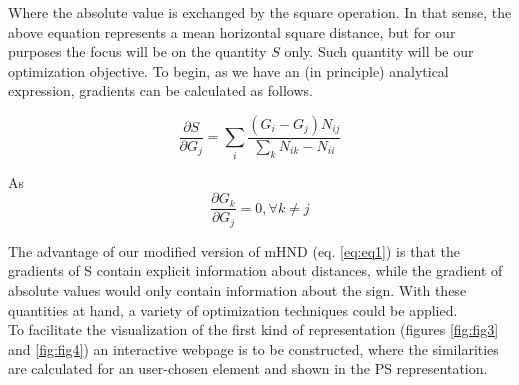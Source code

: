 \documentclass[article]{article}
\begin{document}
Where the absolute value is exchanged by the square operation. In that sense, the above equation represents a mean horizontal square distance, but for our purposes the focus will be on the quantity $S$ only. Such quantity will be our optimization objective. To begin, as we have an (in principle) analytical expression, gradients can be calculated as follows.

\begin{equation}
\frac{\partial S}{\partial G_j} = \sum_i \frac{ ( G_i - G_j ) N_{ij} }{\sum_k N_{ik} - N_{ii}}
\end{equation}

As \\
$$
\frac{\partial G_{k}}{\partial G_j} = 0, \forall k \neq j
$$

The advantage of our modified version of mHND (eq. \ref{eq:eq1}) is that the gradients of S contain explicit information about distances, while the gradient of absolute values would only contain information about the sign. With these quantities at hand, a variety of optimization techniques could be applied. \\





To facilitate the visualization of the first kind of representation (figures \ref{fig:fig3} and \ref{fig:fig4}) an interactive webpage is to be constructed, where the similarities are calculated for an user-chosen element and shown in the PS representation.
 
 

\renewcommand\refname{References}


\end{document}

